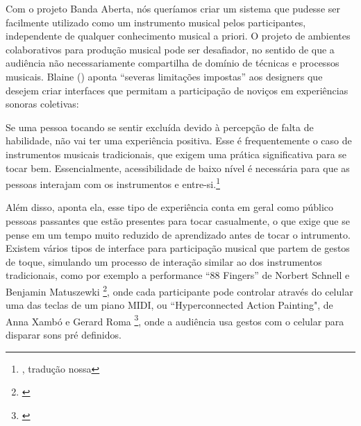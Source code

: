 Com o projeto Banda Aberta, nós queríamos criar um sistema que pudesse ser facilmente utilizado como um instrumento musical pelos participantes, independente de qualquer conhecimento musical a priori. O projeto de ambientes colaborativos para produção musical pode ser desafiador, no sentido de que a audiência não necessariamente compartilha de domínio de técnicas e processos musicais. Blaine (\citeyear{Blaine2003}) aponta ``severas limitações impostas'' aos designers que desejem criar interfaces que permitam a participação de noviços em experiências sonoras coletivas: 

\begin{citacao}
Se uma pessoa tocando se sentir excluída devido à percepção de falta de habilidade, não vai ter uma experiência positiva. Esse é frequentemente o caso de instrumentos musicais tradicionais, que exigem uma prática significativa para se tocar bem. Essencialmente, acessibilidade de baixo nível é necessária para que as pessoas interajam com os instrumentos e entre-si.\footnote{\cite{Blaine2003}, tradução nossa}

\end{citacao}

Além disso, aponta ela, esse tipo de experiência conta em geral como público pessoas passantes que estão presentes para tocar casualmente, o que exige que se pense em um tempo muito reduzido de aprendizado antes de tocar o intrumento. Existem vários tipos de interface para participação musical que partem de gestos de toque, simulando um processo de interação similar ao dos instrumentos tradicionais, como por exemplo a performance ``88 Fingers'' de Norbert Schnell e Benjamin Matuszewki \footnote{\cite{Schnell2017}}, onde cada participante pode controlar através do celular uma das teclas de um piano MIDI, ou ``Hyperconnected Action Painting", de Anna Xambó e Gerard Roma \footnote{\cite{Xambo2017}}, onde a audiência usa gestos com o celular para disparar sons pré definidos. 


